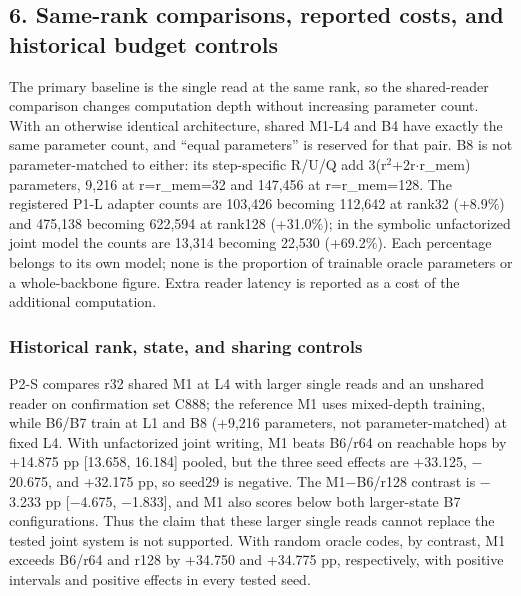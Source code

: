 \subsection*{6. Same-rank comparisons, reported costs, and historical budget controls}

The primary baseline is the single read at the same rank, so the shared-reader
comparison changes computation depth without increasing parameter count. With an  %
otherwise identical architecture, shared M1-L4 and B4 have exactly the same parameter
count, and “equal parameters” is reserved for that pair. B8 is not  %
parameter-matched to either: its step-specific R/\allowbreak{}U/\allowbreak{}Q add 3(r\ensuremath{^2}+2r\ensuremath{\cdot}r\_mem) parameters,
9,216 at r=r\_mem=32 and 147,456 at r=r\_mem=128. The registered P1-L adapter  %
counts are 103,426 becoming 112,642 at rank32 (+8.9\%) and 475,138 becoming 622,594 at
rank128 (+31.0\%); in the symbolic unfactorized joint model the counts are 13,314 becoming
22,530 (+69.2\%). Each percentage belongs to its own model; none is the  %
proportion of trainable oracle parameters or a whole-backbone figure. Extra  %
reader latency is reported as a cost of the additional computation.  %

\subsubsection*{Historical rank, state, and sharing controls}

P2-S compares r32 shared M1 at L4 with larger single reads and an unshared reader on
confirmation set C888; the reference M1 uses mixed-depth training, while B6/\allowbreak{}B7 train at
L1 and B8 (+9,216 parameters, not parameter-matched) at fixed
L4. With unfactorized joint writing, M1  %
beats B6/\allowbreak{}r64 on reachable hops by +14.875 pp [13.658, 16.184] pooled, but the three seed
effects are +33.125, \ensuremath{-}20.675, and +32.175 pp, so seed29 is negative. The M1\ensuremath{-}B6/\allowbreak{}r128 contrast is \ensuremath{-}3.233 pp  %
[\ensuremath{-}4.675, \ensuremath{-}1.833], and M1 also scores below both larger-state B7 configurations. Thus the claim  %
that these larger single reads cannot replace the tested joint system is not
supported. With random oracle codes, by contrast, M1 exceeds B6/\allowbreak{}r64  %
and r128 by +34.750 and +34.775 pp, respectively, with positive intervals and positive
effects in every tested seed.  %

